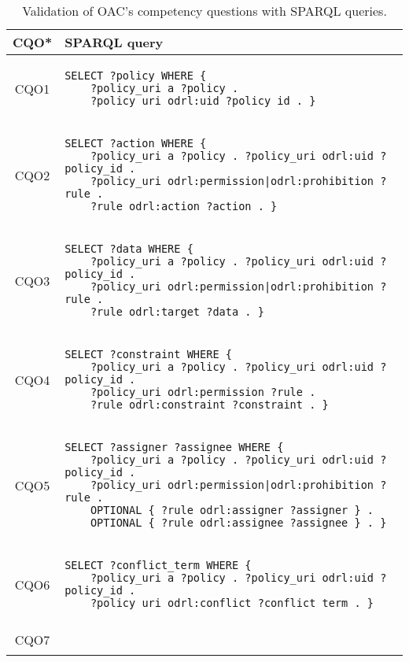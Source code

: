 \begin{table}[htp]
    \centering
    \caption{Validation of OAC's competency questions with SPARQL queries.}
    \label{tab:oac_cq_sparql}
    \begin{tabular}{c|l}
        \textbf{CQO*} & \textbf{SPARQL query} \\
        \hline\hline
        CQO1 & \begin{lstlisting}[numbers=none]
SELECT ?policy WHERE {
    ?policy_uri a ?policy . 
    ?policy_uri odrl:uid ?policy_id . } \end{lstlisting} \\
        \hline
        CQO2 & \begin{lstlisting}[numbers=none]
SELECT ?action WHERE {
    ?policy_uri a ?policy . ?policy_uri odrl:uid ?policy_id . 
    ?policy_uri odrl:permission|odrl:prohibition ?rule .
    ?rule odrl:action ?action . } \end{lstlisting} \\
        \hline
        CQO3 & \begin{lstlisting}[numbers=none]
SELECT ?data WHERE {
    ?policy_uri a ?policy . ?policy_uri odrl:uid ?policy_id . 
    ?policy_uri odrl:permission|odrl:prohibition ?rule .
    ?rule odrl:target ?data . } \end{lstlisting} \\
        \hline
        CQO4 & \begin{lstlisting}[numbers=none]
SELECT ?constraint WHERE {
    ?policy_uri a ?policy . ?policy_uri odrl:uid ?policy_id . 
    ?policy_uri odrl:permission ?rule .
    ?rule odrl:constraint ?constraint . } \end{lstlisting} \\
        \hline
        CQO5 & \begin{lstlisting}[numbers=none]
SELECT ?assigner ?assignee WHERE {
    ?policy_uri a ?policy . ?policy_uri odrl:uid ?policy_id . 
    ?policy_uri odrl:permission|odrl:prohibition ?rule .
    OPTIONAL { ?rule odrl:assigner ?assigner } . 
    OPTIONAL { ?rule odrl:assignee ?assignee } . } \end{lstlisting} \\
        \hline
        CQO6 & \begin{lstlisting}[numbers=none]
SELECT ?conflict_term WHERE {
    ?policy_uri a ?policy . ?policy_uri odrl:uid ?policy_id . 
    ?policy_uri odrl:conflict ?conflict_term . } \end{lstlisting} \\
        \hline
        CQO7 & \begin{lstlisting}[numbers=none]

\end{lstlisting}
\end{tabular}
\end{table}
